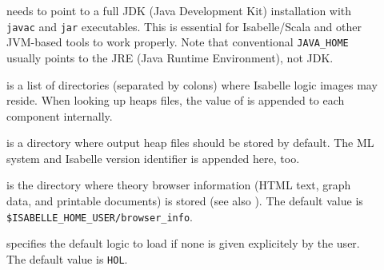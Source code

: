\begin{isabellebody}
\begin{isamarkuptext}
\begin{description}
  \item[\hypertarget{setting.ISABELLE-JDK-HOME}{\hyperlink{setting.ISABELLE-JDK-HOME}{\mbox{}}}] needs to point to a full JDK
  (Java Development Kit) installation with \verb|javac| and
  \verb|jar| executables.  This is essential for Isabelle/Scala
  and other JVM-based tools to work properly.  Note that conventional
  \verb|JAVA_HOME| usually points to the JRE (Java Runtime
  Environment), not JDK.
  
  \item[\hypertarget{setting.ISABELLE-PATH}{\hyperlink{setting.ISABELLE-PATH}{\mbox{}}}] is a list of directories
  (separated by colons) where Isabelle logic images may reside.  When
  looking up heaps files, the value of \hyperlink{setting.ML-IDENTIFIER}{\mbox{}} is
  appended to each component internally.
  
  \item[\hypertarget{setting.ISABELLE-OUTPUT}{\hyperlink{setting.ISABELLE-OUTPUT}{\mbox{}}}] is a
  directory where output heap files should be stored by default. The
  ML system and Isabelle version identifier is appended here, too.
  
  \item[\hypertarget{setting.ISABELLE-BROWSER-INFO}{\hyperlink{setting.ISABELLE-BROWSER-INFO}{\mbox{}}}] is the directory where
  theory browser information (HTML text, graph data, and printable
  documents) is stored (see also ).  The default
  value is \verb|$ISABELLE_HOME_USER/browser_info|.
  
  \item[\hypertarget{setting.ISABELLE-LOGIC}{\hyperlink{setting.ISABELLE-LOGIC}{\mbox{}}}] specifies the default logic to
  load if none is given explicitely by the user.  The default value is
  \verb|HOL|.
  

\end{description}
\end{isamarkuptext}
\end{isabellebody}
